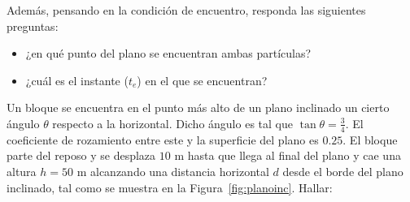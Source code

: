 \documentclass[addpoints]{exam}
\begin{document}
\begin{questions}
    Además, pensando en la condición de encuentro, responda las siguientes preguntas:
    \begin{itemize}
        \item ¿en qué punto del plano se encuentran ambas partículas?
        \item ¿cuál es el instante ($t_e$) en el que se encuentran? 
    \end{itemize}

    \question Un bloque se encuentra en el punto más alto de un plano inclinado un cierto ángulo $\theta$ respecto a la horizontal. Dicho ángulo es tal que $\tan \theta = \frac{3}{4}$. El coeficiente de rozamiento entre este y la superficie del plano es $0.25$. El bloque parte del reposo y se desplaza $10$ m hasta que llega al final del plano y cae una altura $h = 50$ m alcanzando una distancia horizontal $d$ desde el borde del plano inclinado, tal como se muestra en la Figura~\ref{fig:planoinc}. Hallar: \label{ej:planoinc_oblicuo}
    

\end{questions}
\end{document}
